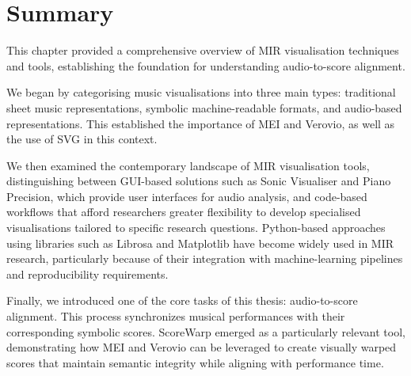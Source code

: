 \section{Summary}
This chapter provided a comprehensive overview of MIR visualisation techniques and tools, establishing the foundation for understanding audio-to-score alignment. 

We began by categorising music visualisations into three main types: traditional sheet music representations, symbolic machine-readable formats, and audio-based representations. This established the importance of MEI and Verovio, as well as the use of SVG in this context.

We then examined the contemporary landscape of MIR visualisation tools, distinguishing between GUI-based solutions such as Sonic Visualiser and Piano Precision, which provide user interfaces for audio analysis, and code-based workflows that afford researchers greater flexibility to develop specialised visualisations tailored to specific research questions. Python-based approaches using libraries such as Librosa and Matplotlib have become widely used in MIR research, particularly because of their integration with machine-learning pipelines and reproducibility requirements.

Finally, we introduced one of the core tasks of this thesis: audio-to-score alignment. This process synchronizes musical performances with their corresponding symbolic scores. ScoreWarp emerged as a particularly relevant tool, demonstrating how MEI and Verovio can be leveraged to create visually warped scores that maintain semantic integrity while aligning with performance time.